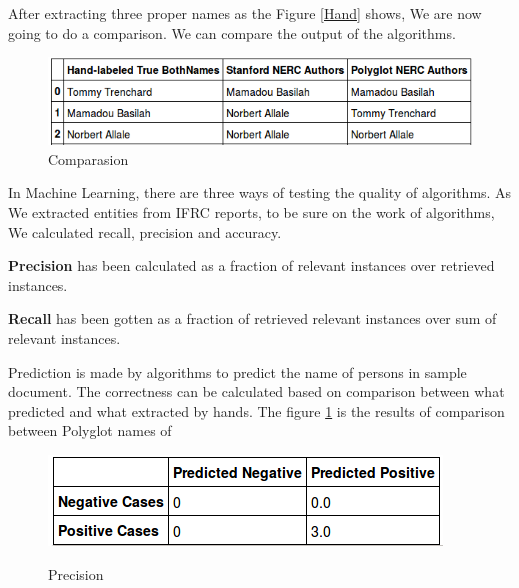 After extracting three proper names as the Figure \ref{Hand} shows,  We are now going to do a comparison. We can compare the output of the algorithms.

\begin{figure}[hbtp]
\caption{Comparasion}
\centering
\includegraphics[scale=.8]{images/comparason.png}
\end{figure}


In Machine Learning, there are three ways of testing the quality of algorithms. As We extracted  entities from IFRC reports, to be sure on the work of algorithms,  We calculated recall, precision and accuracy. 

\textbf{Precision} has been calculated as a  fraction of relevant instances over  retrieved instances.

\textbf{Recall} has been gotten as a fraction of retrieved relevant instances over  sum of relevant instances.



Prediction is made by algorithms to predict the name of persons in sample document. The correctness can be calculated based on comparison between what predicted and what extracted by hands. The figure \ref{prediction} is  the results of comparison between Polyglot names of 
\begin{figure}[hbtp]
\caption{Precision}
\centering
\includegraphics[scale=1]{images/precision.png}\label{prediction}
\end{figure}
